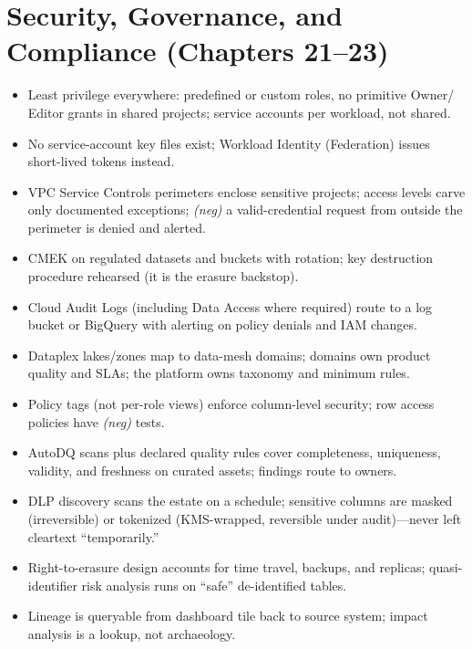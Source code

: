 \section{Security, Governance, and Compliance (Chapters 21--23)}
\begin{itemize}
    \item[$\square$] Least privilege everywhere: predefined or custom roles, no primitive Owner/
    Editor grants in shared projects; service accounts per workload, not shared.
    \item[$\square$] No service-account key files exist; Workload Identity (Federation) issues
    short-lived tokens instead.
    \item[$\square$] VPC Service Controls perimeters enclose sensitive projects; access levels
    carve only documented exceptions; \emph{(neg)} a valid-credential request from outside the
    perimeter is denied and alerted.
    \item[$\square$] CMEK on regulated datasets and buckets with rotation; key destruction
    procedure rehearsed (it is the erasure backstop).
    \item[$\square$] Cloud Audit Logs (including Data Access where required) route to a log
    bucket or BigQuery with alerting on policy denials and IAM changes.
    \item[$\square$] Dataplex lakes/zones map to data-mesh domains; domains own product quality
    and SLAs; the platform owns taxonomy and minimum rules.
    \item[$\square$] Policy tags (not per-role views) enforce column-level security; row access
    policies have \emph{(neg)} tests.
    \item[$\square$] AutoDQ scans plus declared quality rules cover completeness, uniqueness,
    validity, and freshness on curated assets; findings route to owners.
    \item[$\square$] DLP discovery scans the estate on a schedule; sensitive columns are masked
    (irreversible) or tokenized (KMS-wrapped, reversible under audit)---never left cleartext
    ``temporarily.''
    \item[$\square$] Right-to-erasure design accounts for time travel, backups, and replicas;
    quasi-identifier risk analysis runs on ``safe'' de-identified tables.
    \item[$\square$] Lineage is queryable from dashboard tile back to source system; impact
    analysis is a lookup, not archaeology.
\end{itemize}

